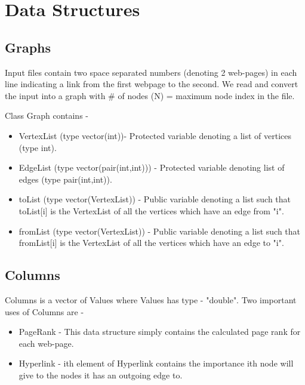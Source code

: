 \documentclass{article}
\begin{document}
    \section{Data Structures}
    \subsection{Graphs}
    Input files contain two space separated numbers (denoting 2 web-pages) in each line indicating a link from the first webpage to the second. We read and convert the input into a graph with # of nodes (N) = maximum node index in the file.
    
    Class Graph contains - 
    \begin{itemize}
        \item VertexList (type vector(int))- Protected variable denoting a list of vertices (type int).
        \item EdgeList (type vector(pair(int,int))) - Protected variable denoting list of edges (type pair(int,int)).
        \item toList (type vector(VertexList)) - Public variable denoting a list such that toList[i] is the VertexList of all the vertices which have an edge from "i".
        \item fromList (type vector(VertexList)) - Public variable denoting a list such that fromList[i] is the VertexList of all the vertices which have an edge to "i".
    \end{itemize}{}
    
    \subsection{Columns}
    Columns is a vector of Values where Values has type - "double". Two important uses of Columns are -
    \begin{itemize}
        \item PageRank - This data structure simply contains the calculated page rank for each web-page.
        \item Hyperlink - ith element of Hyperlink contains the importance ith node will give to the nodes it has an outgoing edge to.
    \end{itemize}
\end{document}
